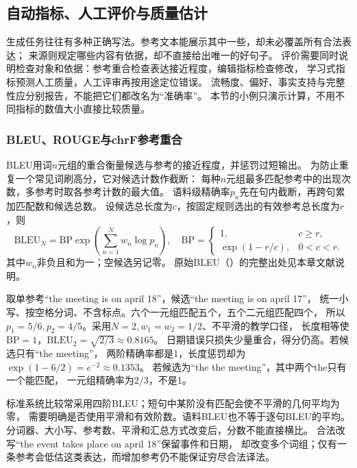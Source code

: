 \subsection{自动指标、人工评价与质量估计}
\label{sec:nlp-generation-evaluation}

生成任务往往有多种正确写法。参考文本能展示其中一些，却未必覆盖所有合法表达；
来源则规定哪些内容有依据，却不直接给出唯一的好句子。
评价需要同时说明检查对象和依据：参考重合检查表达接近程度，编辑指标检查修改，
学习式指标预测人工质量，人工评审再按用途定位错误。
流畅度、偏好、事实支持与完整性应分别报告，不能把它们都改名为“准确率”。
本节的小例只演示计算，不用不同指标的数值大小直接比较质量。

\subsubsection{BLEU、ROUGE与chrF参考重合}
\label{sec:nlp-generation-overlap}

BLEU用词$n$元组的重合衡量候选与参考的接近程度，并惩罚过短输出。
为防止重复一个常见词刷高分，它对候选计数作截断：
每种$n$元组最多匹配参考中的出现次数，多参考时取各参考计数的最大值。
语料级精确率$p_n$先在句内截断，再跨句累加匹配数和候选总数。
设候选总长度为$c$，按固定规则选出的有效参考总长度为$r$，则
\begin{equation}
  \mathrm{BLEU}_N=\mathrm{BP}\exp\!\left(\sum_{n=1}^{N}w_n\log p_n\right),
  \quad
  \mathrm{BP}=
  \begin{cases}
    1,&c\geq r,\\
    \exp(1-r/c),&0<c<r.
  \end{cases}
  \label{eq:nlp-generation-bleu}
\end{equation}
其中$w_n$非负且和为一；空候选另记零。
原始BLEU（\citeyear{papineni-etal-2002-bleu}）的完整出处见本章文献说明。

取单参考“the meeting is on april 18”，候选“the meeting is on april 17”，
统一小写、按空格分词、不含标点。六个一元组匹配五个，五个二元组匹配四个，
所以$p_1=5/6,p_2=4/5$。采用$N=2,w_1=w_2=1/2$、不平滑的教学口径，
长度相等使$\mathrm{BP}=1$，$\mathrm{BLEU}_2=\sqrt{2/3}\approx0.8165$。
日期错误只损失少量重合，得分仍高。若候选只有“the meeting”，
两阶精确率都是1，长度惩罚却为$\exp(1-6/2)=e^{-2}\approx0.1353$。
若候选为“the the meeting”，其中两个the只有一个能匹配，
一元组精确率为$2/3$，不是1。

标准系统比较常采用四阶BLEU；短句中某阶没有匹配会使不平滑的几何平均为零，
需要明确是否使用平滑和有效阶数。语料BLEU也不等于逐句BLEU的平均。
分词器、大小写、参考数、平滑和汇总方式改变后，分数不能直接横比。
合法改写“the event takes place on april 18”保留事件和日期，
却改变多个词组；仅有一条参考会低估这类表达，而增加参考仍不能保证穷尽合法译法。

